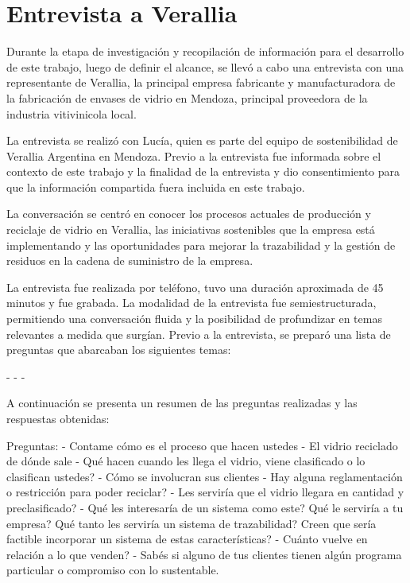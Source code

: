 \chapter{Entrevista a Verallia}
\label{cp:verallia-interview}

\parindent0pt


Durante la etapa de investigación y recopilación de información para el desarrollo de este trabajo, luego de definir el alcance, se llevó a cabo una entrevista con una representante de Verallia, la principal empresa fabricante y manufacturadora de la fabricación de envases de vidrio en Mendoza, principal proveedora de la industria vitivinicola local.

La entrevista se realizó con Lucía, quien es parte del equipo de sostenibilidad de Verallia Argentina en Mendoza. Previo a la entrevista fue informada sobre el contexto de este trabajo y la finalidad de la entrevista y dio consentimiento para que la información compartida fuera incluida en este trabajo. 

La conversación se centró en conocer los procesos actuales de producción y reciclaje de vidrio en Verallia, las iniciativas sostenibles que la empresa está implementando y las oportunidades para mejorar la trazabilidad y la gestión de residuos en la cadena de suministro de la empresa.

La entrevista fue realizada por teléfono, tuvo una duración aproximada de 45 minutos y fue grabada. La modalidad de la entrevista fue semiestructurada, permitiendo una conversación fluida y la posibilidad de profundizar en temas relevantes a medida que surgían. Previo a la entrevista, se preparó una lista de preguntas que abarcaban los siguientes temas:

-
- 
-

A continuación se presenta un resumen de las preguntas realizadas y las respuestas obtenidas:

Preguntas:
- Contame cómo es el proceso que hacen ustedes
- El vidrio reciclado de dónde sale
- Qué hacen cuando les llega el vidrio, viene clasificado o lo clasifican ustedes?
- Cómo se involucran sus clientes
- Hay alguna reglamentación o restricción para poder reciclar?
- Les serviría que el vidrio llegara en cantidad y preclasificado?
- Qué les interesaría de un sistema como este? Qué le serviría a tu empresa? Qué tanto les serviría un sistema de trazabilidad? Creen que sería factible incorporar un sistema de estas características?
- Cuánto vuelve en relación a lo que venden?
- Sabés si alguno de tus clientes tienen algún programa particular o compromiso con lo sustentable.

